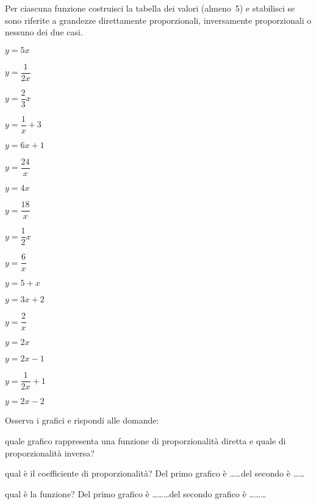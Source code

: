 \begin{esercizio}
 \label{ese:3.124}
Per ciascuna funzione costruisci la tabella dei valori (almeno~5) e stabilisci 
se sono riferite a grandezze direttamente proporzionali, inversamente 
proporzionali o nessuno dei due casi.

\begin{multicols}{3}
\begin{enumeratea}
\spazielenx
\item $y=5x$
\item $y=\dfrac{1}{2x}$
\item $y=\dfrac{2}{3}x$
\item $y=\dfrac{1}{x}+3$
\item $y=6x+1$
\item $y=\dfrac{24}{x}$
\item $y=4x$
\item $y=\dfrac{18}{x}$
\item $y=\dfrac{1}{2}x$
\item $y=\dfrac{6}{x}$
\item $y=5+x$
\item $y=3x+2$
\item $y=\dfrac{2}{x}$
\item $y=2x$
\item $y=2x-1$
\item $y=\dfrac{1}{2x}+1$
\item $y=2x-2$
\end{enumeratea}
\end{multicols}
\end{esercizio}


\begin{esercizio}
 \label{ese:3.125}
Osserva i grafici e rispondi alle domande:
\begin{center}
 \scalebox{.7}{}
%  
\end{center}
\begin{enumeratea}
\item quale grafico rappresenta una funzione di proporzionalità diretta e 
quale di proporzionalità inversa?
\item qual è il coefficiente di proporzionalità? Del primo grafico è 
\ldots\ldots del secondo è \ldots\ldots
\item qual è la funzione? Del primo grafico è \ldots\ldots\ldots del secondo 
grafico è \ldots\ldots\ldots
\end{enumeratea}
\end{esercizio}

